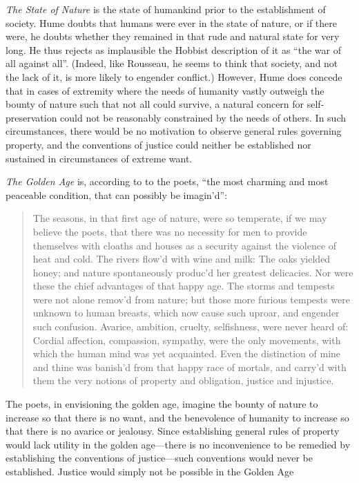 \emph{The State of Nature} is the state of humankind prior to the establishment of society. Hume doubts that humans were ever in the state of nature, or if there were, he doubts whether they remained in that rude and natural state for very long. He thus rejects as implausible the Hobbist description of it as ``the war of all against all''. (Indeed, like Rousseau, he seems to think that society, and not the lack of it, is more likely to engender conflict.) However, Hume does concede that in cases of extremity where the needs of humanity vastly outweigh the bounty of nature such that not all could survive, a natural concern for self-preservation could not be reasonably constrained by the needs of others. In such circumstances, there would be no motivation to observe general rules governing property, and the conventions of justice could neither be established nor sustained in circumstances of extreme want.

\emph{The Golden Age} is, according to to the poets, ``the most charming and most peaceable condition, that can possibly be imagin'd'':

\begin{quote}
	The seasons, in that first age of nature, were so temperate, if we may believe the poets, that there was no necessity for men to provide themselves with cloaths and houses as a security against the violence of heat and cold. The rivers flow'd with wine and milk: The oaks yielded honey; and nature spontaneously produc'd her greatest delicacies. Nor were these the chief advantages of that happy age. The storms and tempests were not alone remov'd from nature; but those more furious tempests were unknown to human breasts, which now cause such uproar, and engender such confusion. Avarice, ambition, cruelty, selfishness, were never heard of: Cordial affection, compassion, sympathy, were the only movements, with which the human mind was yet acquainted. Even the distinction of mine and thine was banish'd from that happy race of mortals, and carry'd with them the very notions of property and obligation, justice and injustice.
\end{quote}

The poets, in envisioning the golden age, imagine the bounty of nature to increase so that there is no want, and the benevolence of humanity to increase so that there is no avarice or jealousy. Since establishing general rules of property would lack utility in the golden age---there is no inconvenience to be remedied by establishing the conventions of justice---such conventions would never be established. Justice would simply not be possible in the Golden Age

